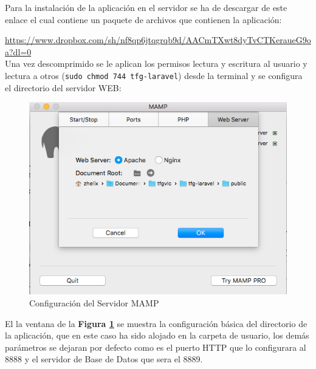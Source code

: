 Para la instalación de la aplicación en el servidor se ha de descargar de este enlace el cual contiene un paquete de archivos que contienen la aplicación: 

\url{https://www.dropbox.com/sh/nf8qp6jtqgrqb9d/AACmTXwt8dyTvCTKeraueG9oa?dl=0}\\

Una vez descomprimido se le aplican los permisos lectura y escritura al usuario y lectura a otros (\texttt{sudo chmod 744 tfg-laravel}) desde la terminal y se configura el directorio del servidor WEB:
\clearpage

\begin{figure}[!h]
	\centering
	\includegraphics[width=0.7\linewidth]{figuras/confmamp}
	\caption{Configuración del Servidor MAMP}
	\label{fig:confmamp}
\end{figure}

El la ventana de la \textbf{Figura \ref{fig:confmamp}} se muestra la configuración básica del directorio de la aplicación, que en este caso ha sido alojado en la carpeta de usuario, los demás parámetros se dejaran por defecto como es el puerto HTTP que lo configurara al 8888 y el servidor de Base de Datos que sera el 8889.

